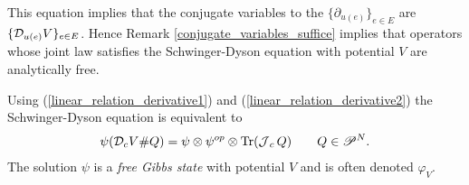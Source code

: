 \begin{rem}
This equation implies that the conjugate variables to the $\{\partial_{u(e)}\}_{e\in E}$ are $\{\mathcal D_{u(e)}V\}_{e\in E}$. Hence Remark \ref{conjugate_variables_suffice} implies that operators whose joint law satisfies the Schwinger-Dyson equation with potential $V$ are analytically free.
\end{rem}

Using (\ref{linear_relation_derivative1}) and (\ref{linear_relation_derivative2}) the Schwinger-Dyson equation is equivalent to
\begin{align}\label{circular_schwinger-dyson}
\psi(\mathcal D_c V \# Q) = \psi\otimes\psi^{op}\otimes\text{Tr}(\operatorname{\mathcal J}_c Q)\qquad Q\in \mathscr{P}^N.
\end{align}
The solution $\psi$ is a \emph{free Gibbs state} with potential $V$ and is often denoted $\varphi_V$.

